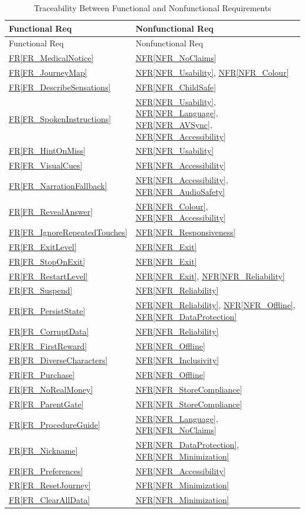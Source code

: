 \documentclass[12pt]{article}
\newcommand{\rref}[1]{\hyperref[#1]{FR\ref*{#1}}}
\newcommand{\nfrref}[1]{\hyperref[#1]{NFR\ref*{#1}}}
\begin{document}
\begin{longtable}{p{} p{}}

\caption{Traceability Between Functional and Nonfunctional Requirements}
\label{tab:FR2Rtm}\\
\toprule
Functional Req & Nonfunctional Req \\
\midrule
\endfirsthead
\toprule
Functional Req & Nonfunctional Req \\
\midrule
\endhead
\rref{FR_MedicalNotice} & \nfrref{NFR_NoClaims} \\
\rref{FR_JourneyMap} & \nfrref{NFR_Usability}, \nfrref{NFR_Colour} \\
\rref{FR_DescribeSensations} & \nfrref{NFR_ChildSafe} \\
\rref{FR_SpokenInstructions} & \nfrref{NFR_Usability}, \nfrref{NFR_Language}, \nfrref{NFR_AVSync}, \nfrref{NFR_Accessibility} \\
\rref{FR_HintOnMiss} & \nfrref{NFR_Usability} \\
\rref{FR_VisualCues} & \nfrref{NFR_Accessibility} \\
\rref{FR_NarrationFallback} & \nfrref{NFR_Accessibility}, \nfrref{NFR_AudioSafety} \\
\rref{FR_RevealAnswer} & \nfrref{NFR_Colour}, \nfrref{NFR_Accessibility} \\
\rref{FR_IgnoreRepeatedTouches} & \nfrref{NFR_Responsiveness} \\
\rref{FR_ExitLevel} & \nfrref{NFR_Exit} \\
\rref{FR_StopOnExit} & \nfrref{NFR_Exit} \\
\rref{FR_RestartLevel} & \nfrref{NFR_Exit}, \nfrref{NFR_Reliability} \\
\rref{FR_Suspend} & \nfrref{NFR_Reliability} \\
\rref{FR_PersistState} & \nfrref{NFR_Reliability}, \nfrref{NFR_Offline}, \nfrref{NFR_DataProtection} \\
\rref{FR_CorruptData} & \nfrref{NFR_Reliability} \\
\rref{FR_FirstReward} & \nfrref{NFR_Offline} \\
\rref{FR_DiverseCharacters} & \nfrref{NFR_Inclusivity} \\
\rref{FR_Purchase} & \nfrref{NFR_Offline} \\
\rref{FR_NoRealMoney} & \nfrref{NFR_StoreCompliance} \\
\rref{FR_ParentGate} & \nfrref{NFR_StoreCompliance} \\
\rref{FR_ProcedureGuide} & \nfrref{NFR_Language}, \nfrref{NFR_NoClaims} \\
\rref{FR_Nickname} & \nfrref{NFR_DataProtection}, \nfrref{NFR_Minimization} \\
\rref{FR_Preferences} & \nfrref{NFR_Accessibility} \\
\rref{FR_ResetJourney} & \nfrref{NFR_Minimization} \\
\rref{FR_ClearAllData} & \nfrref{NFR_Minimization} \\
\bottomrule
\end{longtable}
\end{document}
